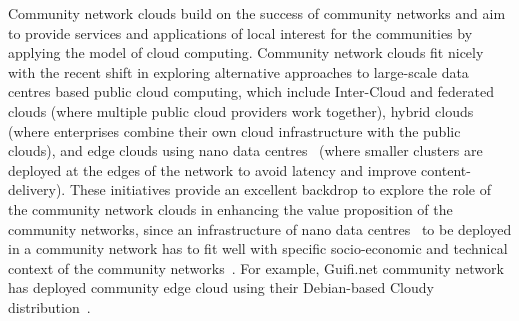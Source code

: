 Community network clouds build on the success of community networks and aim to provide services and applications of local interest for the communities by applying the model of cloud computing.
Community network clouds fit nicely with the recent shift in exploring alternative approaches to large-scale data centres based public cloud computing, which include
	Inter-Cloud and federated clouds (where multiple public cloud providers work together),
	hybrid clouds (where enterprises combine their own cloud infrastructure with the public clouds),
	and edge clouds using nano data centres~\cite{Satyanarayanan2009} (where smaller clusters are deployed at the edges of the network to avoid latency and improve content-delivery).
These initiatives provide an excellent backdrop to explore the role of the community network clouds in enhancing the value proposition of the community networks, 
since an infrastructure of nano data centres~\cite{Satyanarayanan2009} to be deployed in a community network 
has to fit well with specific socio-economic and technical context of the community networks~\cite{Khan2014Sparks}.
For example, Guifi.net community network has deployed community edge cloud using their Debian-based Cloudy distribution~\cite{Baig2015Community}.
